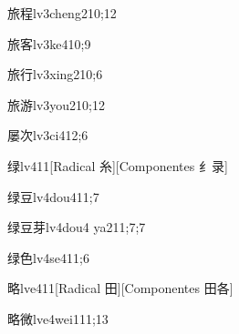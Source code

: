 \begin{verbete}{旅程}{lv3cheng2}{10;12}
\end{verbete}

\begin{verbete}{旅客}{lv3ke4}{10;9}
\end{verbete}

\begin{verbete}{旅行}{lv3xing2}{10;6}
\end{verbete}

\begin{verbete}{旅游}{lv3you2}{10;12}
\end{verbete}

\begin{verbete}{屡次}{lv3ci4}{12;6}
\end{verbete}

\begin{verbete}{绿}{lv4}{11}[Radical 糸][Componentes 纟录]
\end{verbete}

\begin{verbete}{绿豆}{lv4dou4}{11;7}
\end{verbete}

\begin{verbete}{绿豆芽}{lv4dou4 ya2}{11;7;7}
\end{verbete}

\begin{verbete}{绿色}{lv4se4}{11;6}
\end{verbete}

\begin{verbete}{略}{lve4}{11}[Radical 田][Componentes 田各]
\end{verbete}

\begin{verbete}{略微}{lve4wei1}{11;13}
\end{verbete}

